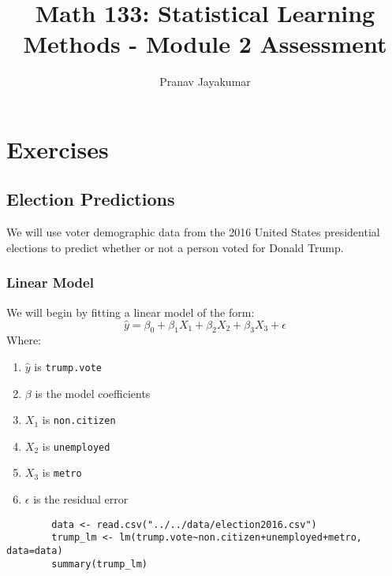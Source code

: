 \documentclass{article}
\title{Math 133: Statistical Learning Methods - Module 2 Assessment}
\author{Pranav Jayakumar}
\theoremstyle{mytheoremstyle}
\theoremstyle{mytheoremstyle}
\theoremstyle{myproblemstyle}
\begin{document}
    \maketitle
    \section{Exercises}
    \vspace{0.1in}
      \subsection{Election Predictions}
      We will use voter demographic data from the 2016 United States presidential elections to predict whether or not a person voted for Donald Trump.
      \vspace{0.1in}
      \subsubsection{Linear Model}
      We will begin by fitting a linear model of the form:
      \[\hat{y} = \beta_0 + \beta_1 X_1 + \beta_2 X_2 + \beta_3 X_3 + \epsilon\]
      Where:
      \begin{enumerate}
        \item \(\hat{y}\) is \verb|trump.vote|
        \item \(\beta\) is the model coefficients
        \item \(X_1\) is \verb|non.citizen|
        \item \(X_2\) is \verb|unemployed|
        \item \(X_3\) is \verb|metro|
        \item \(\epsilon\) is the residual error
      \end{enumerate}
    
      \begin{lstlisting}
        data <- read.csv("../../data/election2016.csv")
        trump_lm <- lm(trump.vote~non.citizen+unemployed+metro, data=data)
        summary(trump_lm)
      \end{lstlisting}
      \vspace{0.1in}
\end{document}
